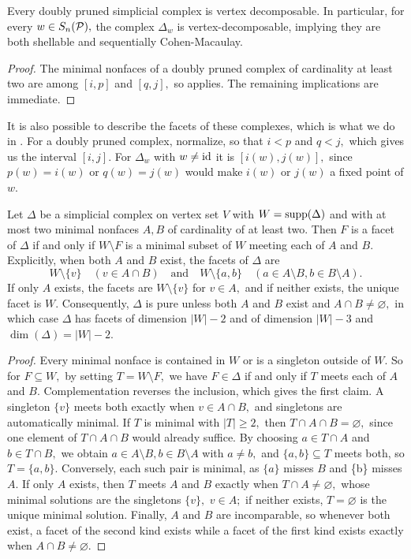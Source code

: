 \begin{theorem}
\label{thm: doubly pruned complexes imply vertex decomposable}
    Every doubly pruned simplicial complex is vertex decomposable. In particular, for every $w\in S_n(\mathcal{P}),$ the complex $\Delta_w$ is vertex-decomposable, implying they are both shellable and sequentially Cohen-Macaulay.
\end{theorem}
\begin{proof}
    The minimal nonfaces of a doubly pruned complex of cardinality at least two are among $[i,p]$ and $[q,j],$ so  applies. The remaining implications are immediate. 
\end{proof}
It is also possible to describe the facets of these complexes, which is what we do in . For a doubly pruned complex, normalize, so that $i<p$ and $q<j,$ which gives us the interval $[i,j].$ For $\Delta_w$ with $w\neq\mathrm{id}$ it is $[i(w),j(w)],$ since $p(w) = i(w)$ or $q(w) = j(w)$ would make $i(w)$ or $j(w)$ a fixed point of $w.$
\begin{proposition}
\label{prop: facet description of doubly pruned complexes}
Let $\Delta$ be a simplicial complex on vertex set $V$ with $W = \mathrm{supp}(\Delta)$ and with at most two minimal nonfaces $A,B$ of cardinality of at least two. 
Then $F$ is a facet of $\Delta$ if and only if $W\setminus F$ is a minimal subset of $W$ meeting each of $A$ and $B.$ Explicitly, when both $A$ and $B$ exist, the facets of $\Delta$ are 
\[
W\setminus\{v\}\quad (v\in A\cap B)\quad\text{and}\quad W\setminus\{a,b\}\quad (a\in A\setminus B,b\in B\setminus A).
\]
If only $A$ exists, the facets are $W\setminus\{v\}$ for $v\in A,$ and if neither exists, the unique facet is $W.$
Consequently, $\Delta$ is pure unless both $A$ and $B$ exist and $A\cap B\neq\varnothing,$ in which case $\Delta$ has facets of dimension $|W|-2$ and of dimension $|W|-3$ and $\dim(\Delta) = |W|-2.$
\end{proposition}
\begin{proof}
    Every minimal nonface is contained in $W$ or is a singleton outside of $W.$ 
    So for $F\subseteq W,$ by setting $T = W\setminus F,$ we have $F\in\Delta$ if and only if $T$ meets each of $A$ and $B.$ Complementation reverses the inclusion, which gives the first claim.
    A singleton $\{v\}$ meets both exactly when $v\in A\cap B,$ and singletons are automatically minimal. If $T$ is minimal with $|T|\geq 2,$ then $T\cap A\cap B = \varnothing,$ since one element of $T\cap A\cap B$ would already suffice. By choosing $a\in T\cap A$ and $b\in T\cap B,$ we obtain $a\in A\setminus B,b\in B\setminus A$ with $a\neq b,$ and $\{a,b\}\subseteq T$ meets both, so $T = \{a,b\}.$  Conversely, each such pair is minimal, as $\{a\}$ misses $B$ and \{b\} misses $A.$ 
    If only $A$ exists, then $T$ meets $A$ and $B$ exactly when $T\cap A\neq\varnothing,$ whose minimal solutions are the singletons $\{v\},$ $v\in A;$ if neither exists, $T = \varnothing$ is the unique minimal solution. Finally, $A$ and $B$ are incomparable, so whenever both exist, a facet of the second kind exists while a facet of the first kind exists exactly when $A\cap B\neq\varnothing.$
\end{proof}
